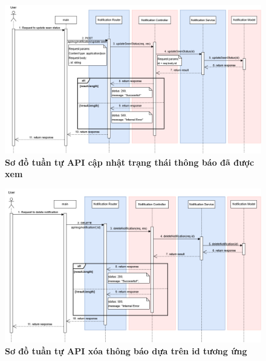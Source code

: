 \begin{figure}[H]
	\centering
	\includegraphics[width=16cm]{Images/api_sequence/noti/updateSeenStatus.drawio.png}
	\caption[Sơ đồ tuần tự API cập nhật trạng thái thông báo đã được xem]{\bfseries \fontsize{12pt}{0pt}\selectfont Sơ đồ tuần tự API cập nhật trạng thái thông báo đã được xem}
	\label{sequence_diagram_update_seen}
\end{figure}

\begin{figure}[H]
	\centering
	\includegraphics[width=16cm]{Images/api_sequence/noti/deleteNotification.drawio.png}
	\caption[Sơ đồ tuần tự API xóa thông báo dựa trên id tương ứng]{\bfseries \fontsize{12pt}{0pt}\selectfont Sơ đồ tuần tự API xóa thông báo dựa trên id tương ứng}
	\label{sequence_diagram_delete_notification}
\end{figure}
\cleardoublepage
